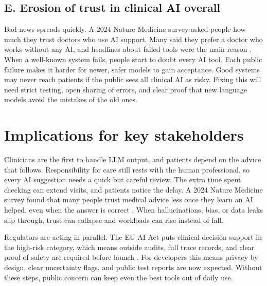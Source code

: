 \documentclass[12pt,a4paper]{scrreprt}
\begin{document}
\subsection*{E. Erosion of trust in clinical AI overall}
Bad news spreads quickly. A 2024 Nature Medicine survey asked people how much they trust doctors who use AI support. Many said they prefer a doctor who works without any AI, and headlines about failed tools were the main reason \autocite{Trust}. When a well-known system fails, people start to doubt every AI tool. Each public failure makes it harder for newer, safer models to gain acceptance. Good systems may never reach patients if the public sees all clinical AI as risky. Fixing this will need strict testing, open sharing of errors, and clear proof that new language models avoid the mistakes of the old ones.


\section*{Implications for key stakeholders}
Clinicians are the first to handle LLM output, and patients depend on the advice that follows. Responsibility for care still rests with the human professional, so every AI suggestion needs a quick but careful review. The extra time spent checking can extend visits, and patients notice the delay. A 2024 Nature Medicine survey found that many people trust medical advice less once they learn an AI helped, even when the answer is correct \autocite{Advice}. When hallucinations, bias, or data leaks slip through, trust can collapse and workloads can rise instead of fall.\par
\vspace{\baselineskip}
\noindent
Regulators are acting in parallel. The EU AI Act puts clinical decision support in the high-risk category, which means outside audits, full trace records, and clear proof of safety are required before launch \autocite{EUAIAct}. For developers this means privacy by design, clear uncertainty flags, and public test reports are now expected. Without these steps, public concern can keep even the best tools out of daily use.
\end{document}
